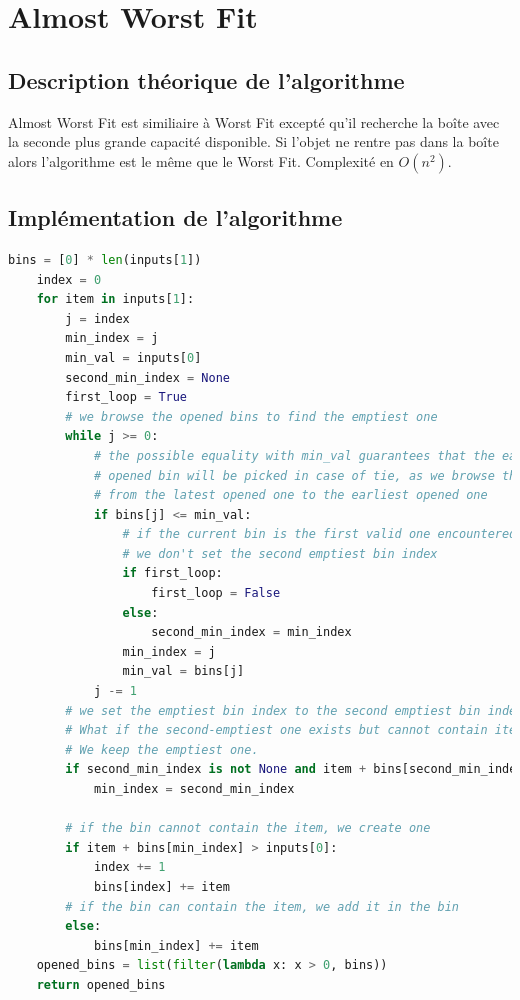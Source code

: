 \documentclass{article}
\begin{document}

\section{Almost Worst Fit}

\subsection{Description théorique de l'algorithme}
Almost Worst Fit est similiaire à Worst Fit excepté qu'il recherche la boîte avec la seconde plus grande capacité
disponible.
Si l'objet ne rentre pas dans la boîte alors l'algorithme est le même que le Worst Fit.
Complexité en $O(n^2)$.
\subsection{Implémentation de l'algorithme}
\begin{lstlisting}[language=Python, frame=single]
    bins = [0] * len(inputs[1])
    index = 0
    for item in inputs[1]:
        j = index
        min_index = j
        min_val = inputs[0]
        second_min_index = None
        first_loop = True
        # we browse the opened bins to find the emptiest one
        while j >= 0:
            # the possible equality with min_val guarantees that the earliest
            # opened bin will be picked in case of tie, as we browse the bins
            # from the latest opened one to the earliest opened one
            if bins[j] <= min_val:
                # if the current bin is the first valid one encountered,
                # we don't set the second emptiest bin index
                if first_loop:
                    first_loop = False
                else:
                    second_min_index = min_index
                min_index = j
                min_val = bins[j]
            j -= 1
        # we set the emptiest bin index to the second emptiest bin index if it exists
        # What if the second-emptiest one exists but cannot contain item ?
        # We keep the emptiest one.
        if second_min_index is not None and item + bins[second_min_index] < inputs[0]:
            min_index = second_min_index

        # if the bin cannot contain the item, we create one
        if item + bins[min_index] > inputs[0]:
            index += 1
            bins[index] += item
        # if the bin can contain the item, we add it in the bin
        else:
            bins[min_index] += item
    opened_bins = list(filter(lambda x: x > 0, bins))
    return opened_bins
\end{lstlisting}
\end{document}
